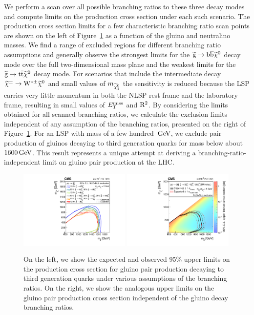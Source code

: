 We perform a scan over all possible branching ratios to these three decay modes 
and compute limits on the production cross section under each such scenario. The production cross section
limits for a few characteristic branching ratio scan points are shown on the left of 
Figure~\ref{fig:GluinoToThirdGenLimits} as a function of the gluino and neutralino masses. We find a range of excluded regions
for different branching ratio assumptions and generally observe the strongest limits for
the $\mathrm{\widetilde{g}}\rightarrow\mathrm{b}\overline{\mathrm{b}}\widetilde{\chi}^0$ decay mode over the full two-dimensional mass plane
and the weakest limits for the $\mathrm{\widetilde{g}}\rightarrow\mathrm{t}\overline{\mathrm{t}}\widetilde{\chi}^0$ decay
mode. For scenarios that include the intermediate decay
$\widetilde{\chi}^{\pm}\to\mathrm{W}^{\ast \pm}\widetilde{\chi}^0$ and small values of $m_{\widetilde{\chi}^{0}_1}$ the sensitivity
is reduced because the LSP carries very little momentum in both the
NLSP rest frame and the laboratory frame, resulting in small values of
$E_{\mathrm{T}}^{\text{miss}}$ and $\mathrm{R}^2$. By considering the limits obtained for all scanned branching ratios, we
calculate the exclusion limits independent of any assumption of the branching
ratios, presented on the right of Figure~\ref{fig:GluinoToThirdGenLimits}. For
an LSP with mass of a few hundred $\,\text{Ge\hspace{-.08em}V}$, we exclude pair production of gluinos decaying 
to third generation quarks for mass below about $1600 \,\text{Ge\hspace{-.08em}V}$. This result 
represents a unique attempt at deriving a branching-ratio-independent limit on
gluino pair production at the LHC.


\begin{figure}[!htb] \centering
\includegraphics[width=0.49\textwidth]{figs/analysis13TeV/UnblindedResults/T1AsymptoticMADD.pdf}
\includegraphics[width=0.49\textwidth]{figs/analysis13TeV/UnblindedResults/T1briFinalXSEC.pdf}
\caption{ On the left, we show the expected and observed 95\% upper limits on the production 
cross section for gluino pair production decaying to third generation quarks under various 
assumptions of the branching ratios. On the right, we show the analogous upper limits on 
the gluino pair production cross section independent of the gluino
decay branching ratios.
}
\label{fig:GluinoToThirdGenLimits}
\end{figure}


